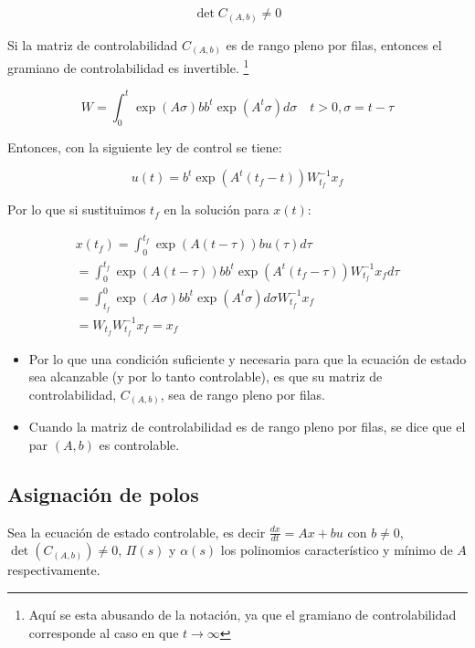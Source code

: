 \documentclass[12pt]{article}
\numberwithin{equation}{subsection}
\begin{document}
\begin{equation}
\det{C_{(A,b)}} \ne 0
\end{equation}

Si la matriz de controlabilidad $C_{(A,b)}$ es de rango pleno por filas, entonces el gramiano de controlabilidad es invertible. \footnote{Aquí se esta abusando de la notación, ya que el gramiano de controlabilidad corresponde al caso en que $t \to \infty$}

\begin{equation}
W = \int_0^t \exp{(A \sigma)} b b^t \exp{(A^t \sigma)} d\sigma \quad t > 0, \sigma = t - \tau
\end{equation}

Entonces, con la siguiente ley de control se tiene:

\begin{equation}
u(t) = b^t \exp{(A^t(t_f - t))} W_{t_f}^{-1} x_f
\end{equation}

Por lo que si sustituimos $t_f$ en la solución para $x(t)$:

\begin{multline}
x(t_f) = \int_0^{t_f} \exp{(A(t - \tau))} b u(\tau) d\tau \\
       = \int_0^{t_f} \exp{(A(t - \tau))} b b^t \exp{(A^t(t_f - \tau))} W_{t_f}^{-1} x_f d\tau \\
       = \int_{t_f}^0 \exp{(A \sigma)} b b^t \exp{(A^t \sigma)} d\sigma W_{t_f}^{-1} x_f \\
       = W_{t_f} W_{t_f}^{-1} x_f = x_f
\end{multline}

\begin{itemize}
\item Por lo que una condición suficiente y necesaria para que la ecuación de estado sea alcanzable (y por lo tanto controlable), es que su matriz de controlabilidad, $C_{(A,b)}$, sea de rango pleno por filas.
\item Cuando la matriz de controlabilidad es de rango pleno por filas, se dice que el par $(A, b)$ es controlable.
\end{itemize}

\subsection{Asignación de polos}

Sea la ecuación de estado controlable, es decir $\frac{dx}{dt} = Ax + bu$ con $b \ne 0$, $\det{(C_{(A,b)})} \ne 0$, $\Pi(s)$ y $\alpha(s)$ los polinomios característico y mínimo de $A$ respectivamente.
\end{document}
